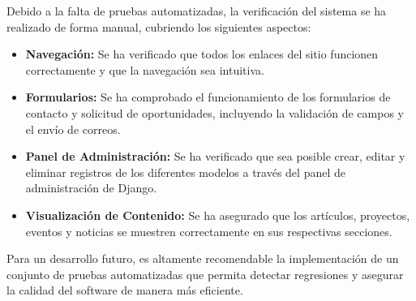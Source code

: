Debido a la falta de pruebas automatizadas, la verificación del sistema se ha realizado de forma manual, cubriendo los siguientes aspectos:
\begin{itemize}
    \item \textbf{Navegación:} Se ha verificado que todos los enlaces del sitio funcionen correctamente y que la navegación sea intuitiva.
    \item \textbf{Formularios:} Se ha comprobado el funcionamiento de los formularios de contacto y solicitud de oportunidades, incluyendo la validación de campos y el envío de correos.
    \item \textbf{Panel de Administración:} Se ha verificado que sea posible crear, editar y eliminar registros de los diferentes modelos a través del panel de administración de Django.
    \item \textbf{Visualización de Contenido:} Se ha asegurado que los artículos, proyectos, eventos y noticias se muestren correctamente en sus respectivas secciones.
\end{itemize}

Para un desarrollo futuro, es altamente recomendable la implementación de un conjunto de pruebas automatizadas que permita detectar regresiones y asegurar la calidad del software de manera más eficiente.